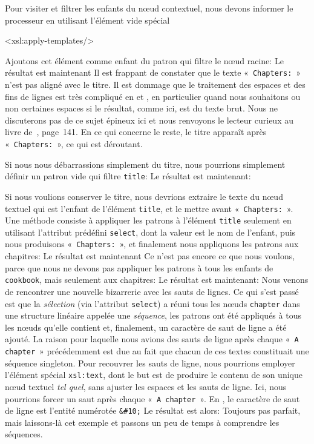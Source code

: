 Pour visiter et filtrer les enfants du n{\oe}ud contextuel, nous
devons informer le processeur en utilisant l'élément vide spécial
\begin{sverb}
<xsl:apply-templates/>
\end{sverb}
Ajoutons cet élément comme enfant du patron qui filtre le n{\oe}ud
racine: 
\noindent Le résultat est maintenant
\noindent Il est frappant de constater que le texte
«~\texttt{Chapters:}~» n'est pas aligné avec le titre. Il est dommage
que le traitement des espaces et des fins de lignes est très compliqué
en \XML et \XSLT, en particulier quand nous souhaitons ou non
certaines espaces si le résultat, comme ici, est du texte brut. Nous
ne discuterons pas de ce sujet épineux ici et nous renvoyons le
lecteur curieux au livre de~\cite{Kay_2008}, page~141. En ce qui
concerne le reste, le titre apparaît après «~\texttt{Chapters:}~», ce
qui est déroutant.

Si nous nous débarrassions simplement du titre, nous pourrions
simplement définir un patron vide qui filtre \texttt{title}:
\noindent Le résultat est maintenant:

Si nous voulions conserver le titre, nous devrions extraire le texte
du n{\oe}ud textuel qui est l'enfant de l'élément \texttt{title}, et
le mettre avant «~\texttt{Chapters:}~». Une méthode consiste à appliquer
les patrons à l'élément \texttt{title} seulement en utilisant
l'attribut prédéfini \texttt{select}, dont la valeur est le nom de
l'enfant, puis nous produisons «~\texttt{Chapters:}~», et finalement
nous appliquons les patrons aux chapitres:
\noindent Le résultat est maintenant
\noindent Ce n'est pas encore ce que nous voulons, parce que nous ne
devons pas appliquer les patrons à tous les enfants de
\texttt{cookbook}, mais seulement aux chapitres:
\noindent Le résultat est maintenant:
\noindent Nous venons de rencontrer une nouvelle bizarrerie avec les
sauts de lignes. Ce qui s'est passé est que la \emph{sélection} (via
l'attribut \texttt{select}) a réuni tous les n{\oe}uds
\texttt{chapter} dans une structure linéaire appelée une
\emph{séquence}, les patrons ont été appliqués à tous les n{\oe}uds
qu'elle contient et, finalement, un caractère de saut de ligne a été
ajouté. La raison pour laquelle nous avions des sauts de ligne après
chaque «~\texttt{A chapter}~» précédemment est due au fait que chacun de
ces textes constituait une séquence singleton. Pour recouvrer les
sauts de ligne, nous pourrions employer l'élément spécial
\texttt{xsl:text}, dont le but est de produire le contenu de son
unique n{\oe}ud textuel \emph{tel quel}, sans ajuster les espaces et
les sauts de ligne. Ici, nous pourrions forcer un saut après chaque
«~\texttt{A chapter}~». En \XML, le caractère de saut de ligne est
l'entité numérotée \verb|&#10;|
\noindent Le résultat est alors:
\noindent Toujours pas parfait, mais laissons-là cet exemple et
passons un peu de temps à comprendre les séquences.


